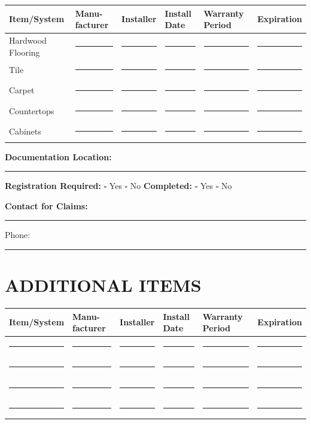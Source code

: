 \documentclass[11pt,letterpaper]{article}
\begin{document}
\begin{tabular}{|p{1.5in}|p{1in}|p{1in}|p{0.8in}|p{0.8in}|p{1in}|}
\hline
\textbf{Item/System} & \textbf{Manu-facturer} & \textbf{Installer} & \textbf{Install Date} & \textbf{Warranty Period} & \textbf{Expiration} \\
\hline
Hardwood Flooring & \rule{0.8in}{0.4pt} & \rule{0.8in}{0.4pt} & \rule{0.6in}{0.4pt} & \rule{0.6in}{0.4pt} & \rule{0.8in}{0.4pt} \\
\hline
Tile & \rule{0.8in}{0.4pt} & \rule{0.8in}{0.4pt} & \rule{0.6in}{0.4pt} & \rule{0.6in}{0.4pt} & \rule{0.8in}{0.4pt} \\
\hline
Carpet & \rule{0.8in}{0.4pt} & \rule{0.8in}{0.4pt} & \rule{0.6in}{0.4pt} & \rule{0.6in}{0.4pt} & \rule{0.8in}{0.4pt} \\
\hline
Countertops & \rule{0.8in}{0.4pt} & \rule{0.8in}{0.4pt} & \rule{0.6in}{0.4pt} & \rule{0.6in}{0.4pt} & \rule{0.8in}{0.4pt} \\
\hline
Cabinets & \rule{0.8in}{0.4pt} & \rule{0.8in}{0.4pt} & \rule{0.6in}{0.4pt} & \rule{0.6in}{0.4pt} & \rule{0.8in}{0.4pt} \\
\hline
\end{tabular}

\vspace{6pt}

\textbf{Documentation Location:} \rule{8cm}{0.4pt}

\textbf{Registration Required:} $\square$ Yes $\square$ No \hspace{0.3in} \textbf{Completed:} $\square$ Yes $\square$ No

\textbf{Contact for Claims:} \rule{7cm}{0.4pt} Phone: \rule{3cm}{0.4pt}

\vspace{12pt}

\section*{ADDITIONAL ITEMS}

\begin{tabular}{|p{1.5in}|p{1in}|p{1in}|p{0.8in}|p{0.8in}|p{1in}|}
\hline
\textbf{Item/System} & \textbf{Manu-facturer} & \textbf{Installer} & \textbf{Install Date} & \textbf{Warranty Period} & \textbf{Expiration} \\
\hline
\rule{1.3in}{0.4pt} & \rule{0.8in}{0.4pt} & \rule{0.8in}{0.4pt} & \rule{0.6in}{0.4pt} & \rule{0.6in}{0.4pt} & \rule{0.8in}{0.4pt} \\
\hline
\rule{1.3in}{0.4pt} & \rule{0.8in}{0.4pt} & \rule{0.8in}{0.4pt} & \rule{0.6in}{0.4pt} & \rule{0.6in}{0.4pt} & \rule{0.8in}{0.4pt} \\
\hline
\rule{1.3in}{0.4pt} & \rule{0.8in}{0.4pt} & \rule{0.8in}{0.4pt} & \rule{0.6in}{0.4pt} & \rule{0.6in}{0.4pt} & \rule{0.8in}{0.4pt} \\
\hline
\rule{1.3in}{0.4pt} & \rule{0.8in}{0.4pt} & \rule{0.8in}{0.4pt} & \rule{0.6in}{0.4pt} & \rule{0.6in}{0.4pt} & \rule{0.8in}{0.4pt} \\
\hline
\end{tabular}
\end{document}
